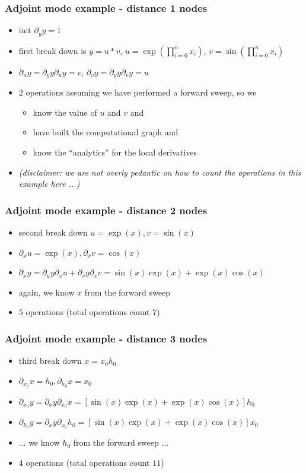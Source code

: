 \documentclass[10pt,German]{beamer}
\begin{document}
\begin{frame}[fragile]
\frametitle{Adjoint mode example - distance 1 nodes}
\begin{itemize}
\item init $\partial_y y = 1$
\item first break down is $y = u*v$, $u=\exp\left( \prod_{i=0}^n x_i \right)$, $v=\sin\left( \prod_{i=0}^n x_i \right)$
\item $\partial_u y = \partial_y y \partial _u y = v$, $\partial_v y = \partial_y y \partial _v y = u$
\item $2$ operations assuming we have performed a forward sweep, so we
\begin{itemize}
\item know the value of $u$ and $v$ and
\item have built the computational graph and
\item know the ``analytics'' for the local derivatives
\end{itemize}
\item \textit{(disclaimer: we are not overly pedantic on how to count the operations in this example here ...)}
\end{itemize}
\end{frame}

\begin{frame}[fragile]
\frametitle{Adjoint mode example - distance 2 nodes}
\begin{itemize}
\item second break down $u = \exp(x), v= \sin(x)$
\item $\partial_x u = \exp(x), \partial_x v = \cos(x)$
\item $\partial_x y = \partial_u y \partial_x u + \partial_v y \partial_x v = \sin(x)\exp(x)+\exp(x)\cos(x)$
\item again, we know $x$ from the forward sweep
\item $5$ operations (total operations count $7$)
\end{itemize}
\end{frame}

\begin{frame}[fragile]
\frametitle{Adjoint mode example - distance 3 nodes}
\begin{itemize}
\item third break down $x = x_0 h_0$
\item $\partial_{x_0} x = h_0, \partial_{h_0} x = x_0$
\item $\partial_{x_0} y = \partial_x y \partial_{x_0} x = [\sin(x)\exp(x)+\exp(x)\cos(x)] h_0$
\item $\partial_{h_0} y = \partial_x y \partial_{x_0} h_0 = [\sin(x)\exp(x)+\exp(x)\cos(x)] x_0$
\item ... we know $h_0$ from the forward sweep ...
\item $4$ operations (total operations count $11$)
\end{itemize}
\end{frame}
\end{document}

